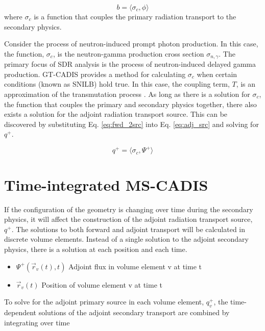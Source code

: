  \begin{equation}\label{eq:fwd_2src}
	 b =
	 \langle \sigma_c, \phi \rangle
 \end{equation}
where $\sigma_c$ is a function that couples the primary
radiation transport to the secondary physics.

Consider the process of neutron-induced prompt photon production.
In this case, the function, $\sigma_c$, is the neutron-gamma production
cross section $\sigma_{n,\gamma}$.  The primary focus of SDR analysis
is the process of neutron-induced delayed gamma production. 
GT-CADIS provides a method for calculating $\sigma_c$ when
certain conditions (known as SNILB) hold true. In this case, the
coupling term, $T$, is an approximation of the transmutation
process \cite{gtcadis}.  As long as there is a solution for $\sigma_c$, the
function that couples the primary and secondary physics together,
there also exists a solution for the adjoint radiation transport source.
This can be discovered by substituting Eq. \ref{eq:fwd_2src} into Eq. 
\ref{eq:adj_src} and solving for $q^{+}$.

 \begin{equation}\label{eq:adj_1src}
	 q^{+} = 
	 \langle \sigma_c, \Psi^{+} \rangle
 \end{equation}


\section{Time-integrated MS-CADIS}
If the configuration of the geometry is changing over time during
the secondary physics, it will affect the construction of the adjoint radiation
transport source, $q^{+}$.  
The solutions to both forward and adjoint transport will be calculated in discrete
volume elements.
Instead of a single solution to the adjoint secondary
physics, there is a solution at each position and each time.%
\begin{itemize}
	\item	{$ \Psi^{+}(\overrightarrow{r}_{v}(t), t)$ Adjoint flux in volume
		element v at time t}
	\item  {$\overrightarrow{r}_{v}(t)$ Position of volume element v at
		time t}
\end{itemize}
To solve for the adjoint primary source in each volume element,
$q_{v}^{+}$, the time-dependent solutions of the 
adjoint secondary transport are combined by integrating over time

